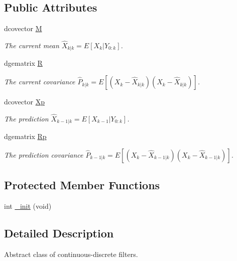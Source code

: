 \subsection*{Public Attributes}
\begin{CompactItemize}
\item 
dcovector \hyperlink{class_c_d___filter_1388124f777df49de87fa59058535cde}{M}
\begin{CompactList}\small\item\em The current mean $ \hat{X}_{k|k}=E[X_k |Y_{0:k}] $. \item\end{CompactList}\item 
dgematrix \hyperlink{class_c_d___filter_7a359404418fc49bf7a038ac27cc579b}{R}
\begin{CompactList}\small\item\em The current covariance $ \hat{P}_{k|k}=E[(X_k-\hat{X}_{k|k})(X_k-\hat{X}_{k|k})] $. \item\end{CompactList}\item 
dcovector \hyperlink{class_c_d___filter_a72ca0f05fe1359cf61ec5db0e1a3282}{Xp}
\begin{CompactList}\small\item\em The prediction $ \hat{X}_{k-1|k}=E[X_{k-1} |Y_{0:k}] $. \item\end{CompactList}\item 
dgematrix \hyperlink{class_c_d___filter_76bc9c00c330ffaa2815f073158353f3}{Rp}
\begin{CompactList}\small\item\em The prediction covariance $ \hat{P}_{k-1|k}=E[(X_k-\hat{X}_{k-1|k})(X_k-\hat{X}_{k-1|k}) ] $. \item\end{CompactList}\end{CompactItemize}
\subsection*{Protected Member Functions}
\begin{CompactItemize}
\item 
int \hyperlink{class_c_d___filter_789c745e24ee5534d22455dff70a93b3}{\_\-init} (void)
\end{CompactItemize}


\subsection{Detailed Description}
Abstract class of continuous-discrete filters. 

